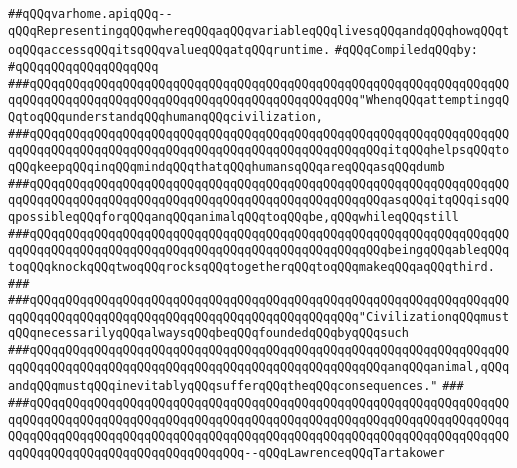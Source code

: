 \label{src/lib/compiler/front/typer-stuff/basics/varhome.api}
\verb|##qQQqvarhome.apiqQQq--qQQqRepresentingqQQqwhereqQQqaqQQqvariableqQQqlivesqQQqandqQQqhowqQQqtoqQQqaccessqQQqitsqQQqvalueqQQqatqQQqruntime.|\newline
\newline
\verb|#qQQqCompiledqQQqby:|\newline
\verb|#qQQqqQQqqQQqqQQqqQQq|\newline
\newline
\newline
\newline
\verb|###qQQqqQQqqQQqqQQqqQQqqQQqqQQqqQQqqQQqqQQqqQQqqQQqqQQqqQQqqQQqqQQqqQQqqQQqqQQqqQQqqQQqqQQqqQQqqQQqqQQqqQQqqQQqqQQqqQQq"WhenqQQqattemptingqQQqtoqQQqunderstandqQQqhumanqQQqcivilization,|\newline
\verb|###qQQqqQQqqQQqqQQqqQQqqQQqqQQqqQQqqQQqqQQqqQQqqQQqqQQqqQQqqQQqqQQqqQQqqQQqqQQqqQQqqQQqqQQqqQQqqQQqqQQqqQQqqQQqqQQqqQQqqQQqitqQQqhelpsqQQqtoqQQqkeepqQQqinqQQqmindqQQqthatqQQqhumansqQQqareqQQqasqQQqdumb|\newline
\verb|###qQQqqQQqqQQqqQQqqQQqqQQqqQQqqQQqqQQqqQQqqQQqqQQqqQQqqQQqqQQqqQQqqQQqqQQqqQQqqQQqqQQqqQQqqQQqqQQqqQQqqQQqqQQqqQQqqQQqqQQqasqQQqitqQQqisqQQqpossibleqQQqforqQQqanqQQqanimalqQQqtoqQQqbe,qQQqwhileqQQqstill|\newline
\verb|###qQQqqQQqqQQqqQQqqQQqqQQqqQQqqQQqqQQqqQQqqQQqqQQqqQQqqQQqqQQqqQQqqQQqqQQqqQQqqQQqqQQqqQQqqQQqqQQqqQQqqQQqqQQqqQQqqQQqqQQqbeingqQQqableqQQqtoqQQqknockqQQqtwoqQQqrocksqQQqtogetherqQQqtoqQQqmakeqQQqaqQQqthird.|\newline
\verb|###|\newline
\verb|###qQQqqQQqqQQqqQQqqQQqqQQqqQQqqQQqqQQqqQQqqQQqqQQqqQQqqQQqqQQqqQQqqQQqqQQqqQQqqQQqqQQqqQQqqQQqqQQqqQQqqQQqqQQqqQQqqQQq"CivilizationqQQqmustqQQqnecessarilyqQQqalwaysqQQqbeqQQqfoundedqQQqbyqQQqsuch|\newline
\verb|###qQQqqQQqqQQqqQQqqQQqqQQqqQQqqQQqqQQqqQQqqQQqqQQqqQQqqQQqqQQqqQQqqQQqqQQqqQQqqQQqqQQqqQQqqQQqqQQqqQQqqQQqqQQqqQQqqQQqqQQqanqQQqanimal,qQQqandqQQqmustqQQqinevitablyqQQqsufferqQQqtheqQQqconsequences."|\newline
\verb|###|\newline
\verb|###qQQqqQQqqQQqqQQqqQQqqQQqqQQqqQQqqQQqqQQqqQQqqQQqqQQqqQQqqQQqqQQqqQQqqQQqqQQqqQQqqQQqqQQqqQQqqQQqqQQqqQQqqQQqqQQqqQQqqQQqqQQqqQQqqQQqqQQqqQQqqQQqqQQqqQQqqQQqqQQqqQQqqQQqqQQqqQQqqQQqqQQqqQQqqQQqqQQqqQQqqQQqqQQqqQQqqQQqqQQqqQQqqQQqqQQqqQQqqQQq--qQQqLawrenceqQQqTartakower|\newline
